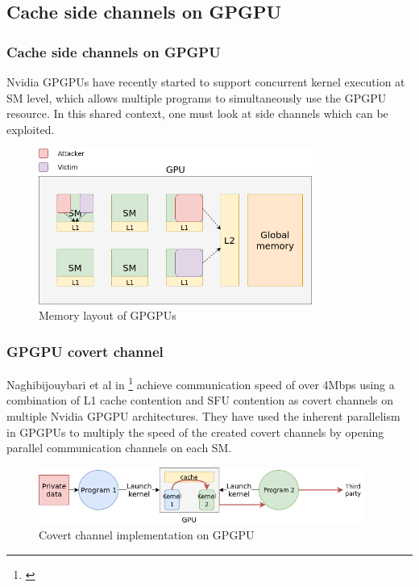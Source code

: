 \documentclass[10pt]{beamer}
\begin{document}
\subsection{Cache side channels on GPGPU}
\begin{frame}
\frametitle{Cache side channels on GPGPU}
Nvidia GPGPUs have recently started to support concurrent kernel execution at SM level, which allows multiple
programs to simultaneously use the GPGPU resource. In this shared context, one must
look at side channels which can be exploited.

\begin{figure}
    \centering
    \includegraphics[width=0.8\textwidth]{gpgpu}
    \caption{Memory layout of GPGPUs}
\end{figure}
\end{frame}

\begin{frame}
\frametitle{GPGPU covert channel}
    Naghibijouybari et al in \footnote{\cite{naghi}} achieve communication speed of over 4Mbps
    using a combination of L1 cache contention and SFU contention as covert channels on multiple Nvidia
    GPGPU architectures. They have used the inherent parallelism in GPGPUs to multiply
    the speed of the created covert channels by opening parallel communication channels on
    each SM.
\begin{figure}
    \centering
    \includegraphics[width=0.95\textwidth]{covert_channel}
    \caption{Covert channel implementation on GPGPU}
\end{figure}
\end{frame}
\end{document}
